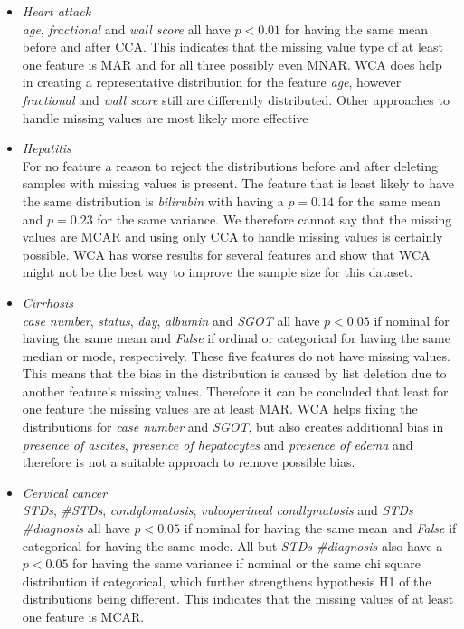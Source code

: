 \documentclass[10pt,a4paper]{report}
\begin{document}
	\begin{itemize}
		\item \textit{Heart attack} \\ 
		\textit{age}, \textit{fractional} and \textit{wall score} all have $p < 0.01$ for having the same mean before and after CCA. This indicates that the missing value type of at least one feature is MAR and for all three possibly even MNAR. WCA does help in creating a representative distribution for the feature \textit{age}, however \textit{fractional} and \textit{wall score} still are differently distributed. Other approaches to handle missing values are most likely more effective
		\item \textit{Hepatitis} \\ 
		For no feature a reason to reject the distributions before and after deleting samples with missing values is present. The feature that is least likely to have the same distribution is \textit{bilirubin} with having a $p = 0.14$ for the same mean and $p = 0.23$ for the same variance. We therefore cannot say that the missing values are MCAR and using only CCA to handle missing values is certainly possible. WCA has worse results for several features and show that WCA might not be the best way to improve the sample size for this dataset.
		\item \textit{Cirrhosis} \\ 
		\textit{case number}, \textit{status}, \textit{day}, \textit{albumin} and \textit{SGOT} all have $p < 0.05$ if nominal for having the same mean and \textit{False} if ordinal or categorical for having the same median or mode, respectively. These five features do not have missing values. This means that the bias in the distribution is caused by list deletion due to another feature's missing values. Therefore it can be concluded that least for one feature the missing values are at least MAR. WCA helps fixing the distributions for \textit{case number} and \textit{SGOT}, but also creates additional bias in \textit{presence of ascites}, \textit{presence of hepatocytes} and \textit{presence of edema} and therefore is not a suitable approach to remove possible bias. 
		\item \textit{Cervical cancer} \\ 
		\textit{STDs}, \textit{\#STDs}, \textit{condylomatosis}, \textit{vulvoperineal condlymatosis} and \textit{STDs \#diagnosis} all have $p < 0.05$ if nominal for having the same mean and \textit{False} if categorical for having the same mode. All but \textit{STDs \#diagnosis} also have a $p < 0.05$ for having the same variance if nominal or the same chi square distribution if categorical, which further strengthens hypothesis H1 of the distributions being different. This indicates that the missing values of at least one feature is MCAR.
	\end{itemize}
	
\end{document}
